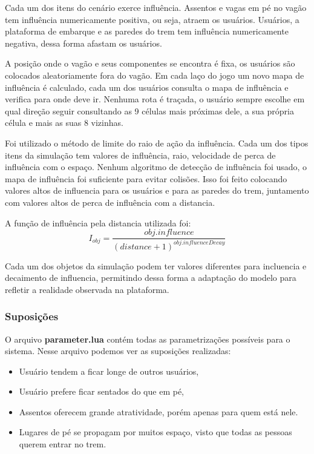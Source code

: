 \documentclass[a4paper]{article}
\begin{document}
Cada um dos itens do cenário exerce influência. Assentos e vagas em pé no vagão tem influência numericamente positiva, ou seja, atraem os usuários. Usuários, a plataforma de embarque e as paredes do trem tem influência numericamente negativa, dessa forma afastam os usuários.

A posição onde o vagão e seus componentes se encontra é fixa, os usuários são colocados aleatoriamente fora do vagão. Em cada laço do jogo um novo mapa de influência é calculado, cada um dos usuários consulta o mapa de influência e verifica para onde deve ir. Nenhuma rota é traçada, o usuário sempre escolhe em qual direção seguir consultando as 9 células mais próximas dele, a sua própria célula e mais as suas 8 vizinhas.

Foi utilizado o método de limite do raio de ação da influência. Cada um dos tipos itens da simulação tem valores de influência, raio, velocidade de perca de influência com o espaço. Nenhum algoritmo de detecção de influência foi usado, o mapa de influência foi suficiente para evitar colisões. Isso foi feito colocando valores altos de influencia para os usuários e para as paredes do trem, juntamento com valores altos de perca de influência com a distancia.

A função de influência pela distancia utilizada foi:
\[I_{obj} = \frac{obj.influence}{(distance + 1) ^{obj.influenceDecay}}\]

Cada um dos objetos da simulação podem ter valores diferentes para incluencia e decaimento de influencia, permitindo dessa forma a adaptação do modelo para refletir a realidade observada na plataforma.

\subsubsection{Suposições}

O arquivo \textbf{parameter.lua} contém todas as parametrizações possíveis para o sistema. Nesse arquivo podemos ver as suposições realizadas:

\begin{itemize}
\item Usuário tendem a ficar longe de outros usuários,
\item Usuário prefere ficar sentados do que em pé,
\item Assentos oferecem grande atratividade, porém apenas para quem está nele.
\item Lugares de pé se propagam por muitos espaço, visto que todas as pessoas querem entrar no trem.
\end{itemize}
\end{document}
